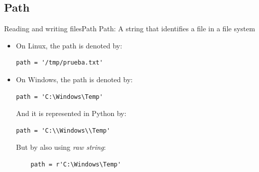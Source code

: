 \documentclass[10pt,compress]{beamer} %
\begin{document}
\subsection{Path}

\begin{frame}[fragile]{Reading and writing files}{Path}
	\alert{Path}: A string that identifies a file in a file system
	\begin{itemize}
		\item On Linux, the path is denoted by: \\
\begin{verbatim}
path = '/tmp/prueba.txt'
\end{verbatim}
		\item On Windows, the path is denoted by: \\
\begin{verbatim}
path = 'C:\Windows\Temp'
\end{verbatim}
		And it is represented  in Python by:\\
\begin{verbatim}
path = 'C:\\Windows\\Temp'
\end{verbatim}
		But by also using \textit{raw string}:
\begin{verbatim}
    path = r'C:\Windows\Temp'
\end{verbatim}
\end{itemize}
\end{frame}
\end{document}
